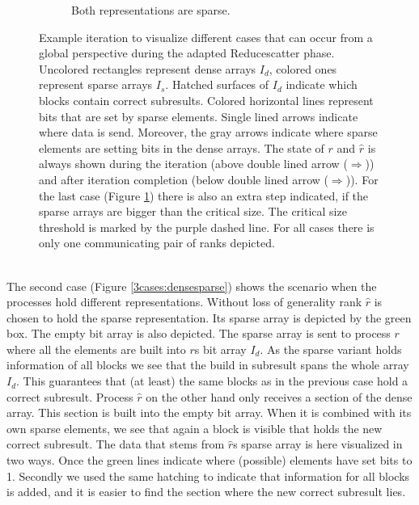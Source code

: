 \begin{figure}
\begin{subfigure}{0.3\textwidth}
		\caption{Both representations are sparse.}
		\label{3cases:sparsesparse}
	\end{subfigure}
	\caption{Example iteration to visualize different cases that can occur from a global perspective during the adapted Reducescatter phase. Uncolored rectangles represent dense arrays $I_d$, colored ones represent sparse arrays $I_s$. Hatched surfaces of $I_d$ indicate which blocks contain correct subresults. Colored horizontal lines represent bits that are set by sparse elements. Single lined arrows indicate where data is send. Moreover, the gray arrows  indicate where sparse elements are setting bits in the dense arrays. The state of $r$ and $\hat{r}$ is always shown during the iteration (above double lined arrow ($\Rightarrow$)) and after iteration completion (below double lined arrow ($\Rightarrow$)). For the last case (Figure \ref{3cases:sparsesparse}) there is also an extra step indicated, if the sparse arrays are bigger than the critical size. The critical size threshold is marked by the purple dashed line. For all cases there is only one communicating pair of ranks depicted.}
	\label{fig:3cases}
\end{figure}
\\The second case (Figure \ref{3cases:densesparse}) shows the scenario when the processes hold different representations. Without loss of generality rank $\hat{r}$ is chosen to hold the sparse representation. Its sparse array is depicted by the green box. The empty bit array is also depicted. The sparse array is sent to process $r$ where all the elements are built into $r$s bit array $I_d$. As the sparse variant holds information of all blocks we see that the build in  subresult spans the whole array $I_d$. This guarantees that (at least) the same blocks as in the previous case hold a correct  subresult. Process $\hat{r}$ on the other hand only receives a section of the dense array. This section is built into the empty bit array. When it is combined with its own sparse elements, we see that again a block is visible that holds the new correct  subresult. The data that stems from $\hat{r}$s sparse array is here visualized in two ways. Once the green lines indicate where (possible) elements have set bits to 1. Secondly we used the same hatching to indicate that information for all blocks is added, and it is easier to find the section where the new correct  subresult lies. \\
